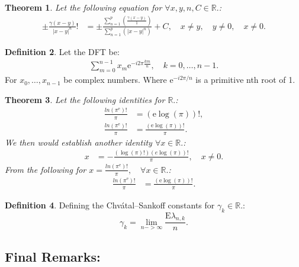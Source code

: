 \documentclass[10pt]{article}
\theoremstyle{plain}
\newtheorem{theorem}{Theorem}[section]
\theoremstyle{definition}
\newtheorem{definition}[theorem]{Definition}
\theoremstyle{remark}
\begin{document}
\begin{theorem}
	Let the following equation for $\forall x, y, n, C \in \mathbb{R}.$:
	\begin{align*}
		\pm \frac{\gamma(x-y)}{|x - y|^{n}}! &= \pm \frac{\sum_{n=1}^{p}(\frac{\gamma(x-y)}{1})}{\sum_{n=1}^{p}(|x - y|^{n})} + C, \quad x \neq y, \quad y \neq 0, \quad x \neq 0.
	\end{align*}
\end{theorem}

\begin{definition}
	Let the DFT be:
	\begin{align*}
		\sum_{m=0}^{n-1} x_{m}\mathrm{e}^{-i2\pi \frac{km}{n}}, \quad k = 0,\dots,n-1.
	\end{align*}
	For $x_{0}, \dots, x_{n-1}$ be complex numbers. Where $\mathrm{e}^{-i2\pi /n}$ is a primitive nth root of 1.
\end{definition}

\begin{theorem}
	Let the following identities for $\mathbb{R}.$:
	\begin{align*}
		\frac{ln(\pi^\mathrm{e})!}{\pi} &= (\mathrm{e} \log(\pi))!,\\
		\frac{ln(\pi^\mathrm{e})!}{\pi} &= \frac{(\mathrm{e} \log(\pi))!}{\pi}.
	\end{align*}
	We then would establish another identity $\forall x \in \mathbb{R}.$:
	\begin{align*}
		x &= -\frac{(\log(\pi)!) (e \log(\pi))!}{\pi}, \quad x \neq 0.
	\end{align*}
	From the following for $x = \frac{ln(\pi^\mathrm{e})!}{\pi}, \quad \forall x \in \mathbb{R}.$:
	\begin{align*}
		\frac{ln(\pi^\mathrm{e})!}{\pi} &= \frac{(\mathrm{e} \log(\pi))!}{\pi}.
	\end{align*}
\end{theorem}

\begin{definition}
	Defining the Chvátal–Sankoff constants for $\gamma_k \in \mathbb{R}.$:
	\begin{equation}
		\gamma_k = \lim_{n -> \infty} \frac{\mathrm{E}{\lambda_{n, k}}}{n}.
	\end{equation}
\end{definition}

\subsection{Final Remarks:}
\end{document}

